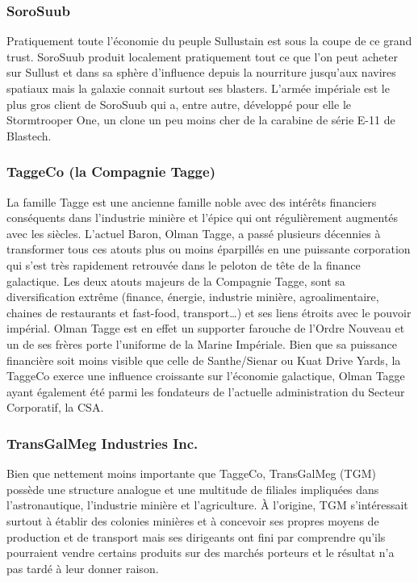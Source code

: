 \documentclass[twoside]{article}
\begin{document}
\subsubsection{SoroSuub}
Pratiquement toute l'économie du peuple Sullustain est sous la coupe de ce grand trust. SoroSuub produit localement pratiquement tout ce que l'on peut acheter sur Sullust et dans sa sphère d'influence depuis la nourriture jusqu'aux navires spatiaux mais la galaxie connait surtout ses blasters. L'armée impériale est le plus gros client de SoroSuub qui a, entre autre, développé pour elle le Stormtrooper One, un clone un peu moins cher de la carabine de série E-11 de Blastech.

\subsubsection{TaggeCo (la Compagnie Tagge)}
La famille Tagge est une ancienne famille noble avec des intérêts financiers conséquents dans l'industrie minière et l'épice qui ont régulièrement augmentés avec les siècles. L'actuel Baron, Olman Tagge, a passé plusieurs décennies à transformer tous ces atouts plus ou moins éparpillés en une puissante corporation qui s'est très rapidement retrouvée dans le peloton de tête de la finance galactique. Les deux atouts majeurs de la Compagnie Tagge, sont sa diversification extrême (finance, énergie, industrie minière, agroalimentaire, chaines de restaurants et fast-food, transport\ldots) et ses liens étroits avec le pouvoir impérial. Olman Tagge est en effet un supporter farouche de l'Ordre Nouveau et un de ses frères porte l'uniforme de la Marine Impériale. Bien que sa puissance financière soit moins visible que celle de Santhe/Sienar ou Kuat Drive Yards, la TaggeCo exerce une influence croissante sur l'économie galactique, Olman Tagge ayant également été parmi les fondateurs de l'actuelle administration du Secteur Corporatif, la CSA.

\subsubsection{TransGalMeg Industries Inc.}
Bien que nettement moins importante que TaggeCo, TransGalMeg (TGM) possède une structure analogue et une multitude de filiales impliquées dans l'astronautique, l'industrie minière et l'agriculture. À l'origine, TGM s'intéressait surtout à établir des colonies minières et à concevoir ses propres moyens de production et de transport mais ses dirigeants ont fini par comprendre qu'ils pourraient vendre certains produits sur des marchés porteurs et le résultat n'a pas tardé à leur donner raison.
\end{document}
